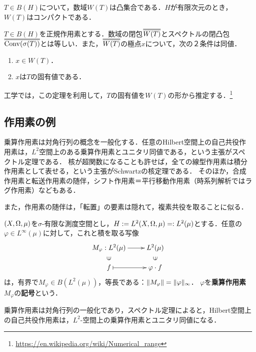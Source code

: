 \documentclass[uplatex,dvipdfmx]{jsreport}
\begin{document}
\begin{proposition}
    $T\in B(H)$について，数域$W(T)$は凸集合である．$H$が有限次元のとき，$W(T)$はコンパクトである．
\end{proposition}

\begin{proposition}
    $T\in B(H)$を正規作用素とする．数域の閉包$\oo{W(T)}$とスペクトルの閉凸包$\oo{\Conv(\sigma(T))}$とは等しい．また，$\oo{W(T)}$の極点$x$について，次の２条件は同値．
    \begin{enumerate}
        \item $x\in W(T)$．
        \item $x$は$T$の固有値である．
    \end{enumerate}
\end{proposition}
\begin{remark}
    工学では，この定理を利用して，$T$の固有値を$W(T)$の形から推定する．\footnote{\url{https://en.wikipedia.org/wiki/Numerical_range}}
\end{remark}

\subsection{作用素の例}

\begin{tcolorbox}[colframe=ForestGreen, colback=ForestGreen!10!white,breakable,colbacktitle=ForestGreen!40!white,coltitle=black,fonttitle=\bfseries\sffamily,
title=]
    乗算作用素は対角行列の概念を一般化する．任意のHilbert空間上の自己共役作用素は，$L^2$空間上のある乗算作用素とユニタリ同値である，という主張がスペクトル定理である．
    核が超関数になることも許せば，全ての線型作用素は積分作用素として表せる，という主張がSchwartzの核定理である．
    そのほか，合成作用素と転送作用素の随伴，シフト作用素＝平行移動作用素（時系列解析ではラグ作用素）などもある．

    また，作用素の随伴は，「転置」の要素は隠れて，複素共役を取ることに似る．
\end{tcolorbox}

\begin{theorem}\label{operator-multiplication}
    $(X,\Omega,\mu)$を$\sigma$-有限な測度空間とし，$H:=L^2(X,\Omega,\mu)=:L^2(\mu)$とする．任意の$\varphi\in L^\infty(\mu)$に対して，これと積を取る写像
    \[\xymatrix@R-2pc{
        M_\varphi:L^2(\mu)\ar[r]&L^2(\mu)\\
        \rotatebox[origin=c]{90}{$\in$}&\rotatebox[origin=c]{90}{$\in$}\\
        f\ar@{|->}[r]&\varphi\cdot f
    }\]
    は，有界で$M_\varphi\in B(L^2(\mu))$，等長である：$\|M_\varphi\|=\|\varphi\|_\infty$．
    $\varphi$を\textbf{乗算作用素}$M_\varphi$の\textbf{記号}という．

    乗算作用素は対角行列の一般化であり，スペクトル定理によると，Hilbert空間上の自己共役作用素は，$L^2$-空間上の乗算作用素とユニタリ同値になる．
\end{theorem}
\end{document}
